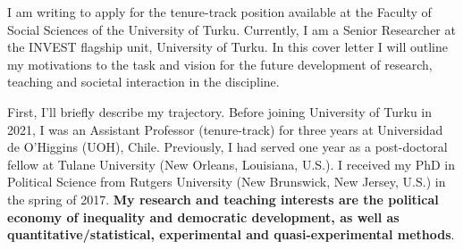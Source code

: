 \documentclass[10pt,stdletter,dateno,sigleft]{newlfm} %
\begin{document}
\begin{newlfm}


\vspace{-2cm}I am writing to apply for the tenure-track position available at the Faculty of Social Sciences of the University of Turku. Currently, I am a Senior Researcher at the INVEST flagship unit, University of Turku. In this cover letter I will outline my motivations to the task and vision for the future development of research, teaching and societal interaction in the discipline.

First, I'll briefly describe my trajectory. Before joining University of Turku in 2021, I was an Assistant Professor (tenure-track) for three years at Universidad de O'Higgins (UOH), Chile. Previously, I had served one year as a post-doctoral fellow at Tulane University (New Orleans, Louisiana, U.S.). I received my PhD in Political Science from Rutgers University (New Brunswick, New Jersey, U.S.) in the spring of 2017. {\bf My research and teaching interests are the political economy of inequality and democratic development, as well as quantitative/statistical, experimental and quasi-experimental methods}. 






\end{newlfm}
\end{document}
